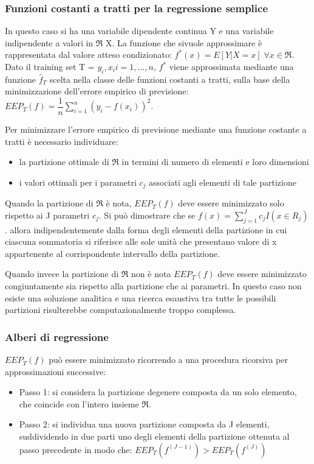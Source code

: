 \documentclass[a4paper]{extarticle}
\begin{document}
\subsubsection{Funzioni costanti a tratti per la regressione semplice}

In questo caso si ha una variabile dipendente continua Y e una variabile indipendente a valori in $\Re$ X. La funzione che sivuole approssimare è rappresentata dal valore atteso condizionato: $f^*(x) = E[Y | X = x] \; \forall x \in \Re$. Dato il training set T = ${y_i,x_i i = 1,\dots, n}$, $f^*$ viene approssimata mediante una funzione $\hat f_T$ scelta nella classe delle funzioni costanti a tratti, sulla base della minimizzazione dell'errore empirico di previsione: $EEP_T(f) = \dfrac{1}{n}\sum\limits_{i=1}^n (y_i - f(x_i))^2$.

Per minimizzare l'errore empirico di previsione mediante una funzione costante a tratti è necessario individuare:

\begin{itemize}
\item la partizione ottimale di $\Re$ in termini di numero di elementi e loro dimensioni
\item i valori ottimali per i parametri $c_j$ associati agli elementi di tale partizione
\end{itemize}

Quando la partizione di $\Re$ è nota, $EEP_T(f)$ deve essere minimizzato solo rispetto ai J parametri $c_j$. Si può dimostrare che se $f(x) =  \sum\limits_{j=1}^J c_jI (x \in R_j)$. allora indipendentemente dalla forma degli elementi della partizione in cui ciascuna sommatoria si riferisce alle sole unità che presentano valore di x appartenente al corrispondente intervallo della partizione.

Quando invece la partizione di $\Re$ non è nota $EEP_T(f)$ deve essere minimizzato congiuntamente sia rispetto alla partizione che ai parametri. In questo caso non esiste una soluzione analitica e una ricerca esaustiva tra tutte le possibili partizioni risulterebbe computazionalmente troppo complessa.

\subsubsection{Alberi di regressione}

$EEP_T(f)$ può essere minimizzato ricorrendo a una procedura ricorsiva per approssimazioni successive:
\begin{itemize}
\item Passo 1: si considera la partizione degenere composta da un solo elemento, che coincide con l'intero insieme $\Re$.
\item Passo 2: si individua una nuova partizione composta da J elementi, suddividendo in due parti uno degli elementi della partizione ottenuta al passo precedente in modo che: $EEP_T(f^{(J-1)})>EEP_T(f^{(J)})$
\end{itemize}
\end{document}
